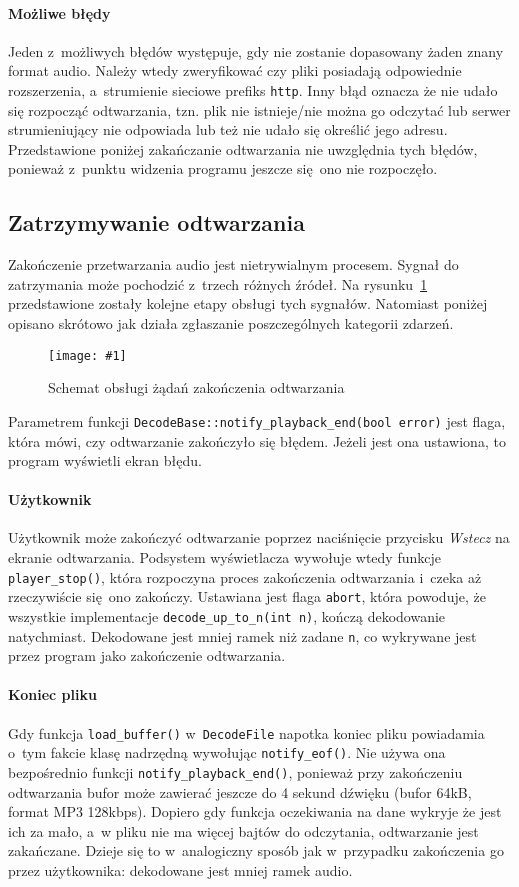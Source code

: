 \documentclass[polish]{aghengthesis}
\newcommand{\imgint}[4]{
	\begin{figure}[{#4}]
		\centering
		\texttt{[image: \#1]}
		\caption{#2}
		\label{#1}
	\end{figure}
}
\newcommand{\imgh}[3]{\imgint{#1}{#2}{#3}{H}}
\begin{document}
			\paragraph{Możliwe błędy}
				Jeden z~możliwych błędów występuje, gdy nie zostanie dopasowany żaden znany format audio. Należy wtedy zweryfikować czy pliki posiadają odpowiednie rozszerzenia, a~strumienie sieciowe prefiks \lstinline|http|. Inny błąd oznacza że nie udało się rozpocząć odtwarzania, tzn. plik nie istnieje/nie można go odczytać lub serwer strumieniujący nie odpowiada lub też nie udało się określić jego adresu. Przedstawione poniżej zakańczanie odtwarzania nie uwzględnia tych błędów, ponieważ z~punktu widzenia programu jeszcze się ono nie rozpoczęło.
		
		\subsection{Zatrzymywanie odtwarzania}
			Zakończenie przetwarzania audio jest nietrywialnym procesem. Sygnał do zatrzymania może pochodzić z~trzech różnych źródeł. Na rysunku~\ref{3/PicoRadio-stop} przedstawione zostały kolejne etapy obsługi tych sygnałów. Natomiast poniżej opisano skrótowo jak działa zgłaszanie poszczególnych kategorii zdarzeń. 
			
			\imgh{3/PicoRadio-stop}{Schemat obsługi żądań zakończenia odtwarzania}{1}
			
			Parametrem funkcji \lstinline|DecodeBase::notify_playback_end(bool error)| jest flaga, która mówi, czy odtwarzanie zakończyło się błędem. Jeżeli jest ona ustawiona, to program wyświetli ekran błędu.
			
			\paragraph{Użytkownik}
				Użytkownik może zakończyć odtwarzanie poprzez naciśnięcie przycisku \textit{Wstecz} na ekranie odtwarzania. Podsystem wyświetlacza wywołuje wtedy funkcje \lstinline|player_stop()|, która rozpoczyna proces zakończenia odtwarzania i~czeka aż rzeczywiście się ono zakończy. Ustawiana jest flaga \lstinline|abort|, która powoduje, że wszystkie implementacje \lstinline|decode_up_to_n(int n)|, kończą dekodowanie natychmiast. Dekodowane jest mniej ramek niż zadane \lstinline|n|, co wykrywane jest przez program jako zakończenie odtwarzania.
			
			\paragraph{Koniec pliku}
				Gdy funkcja \lstinline|load_buffer()| w~\lstinline|DecodeFile| napotka koniec pliku powiadamia o~tym fakcie klasę nadrzędną wywołując \lstinline|notify_eof()|. Nie używa ona bezpośrednio funkcji \lstinline|notify_playback_end()|, ponieważ przy zakończeniu odtwarzania bufor może zawierać jeszcze do 4 sekund dźwięku (bufor 64kB, format MP3 128kbps). Dopiero gdy funkcja oczekiwania na dane wykryje że jest ich za mało, a~w pliku nie ma więcej bajtów do odczytania, odtwarzanie jest zakańczane. Dzieje się to w~analogiczny sposób jak w~przypadku zakończenia go przez użytkownika: dekodowane jest mniej ramek audio.
			
\end{document}
